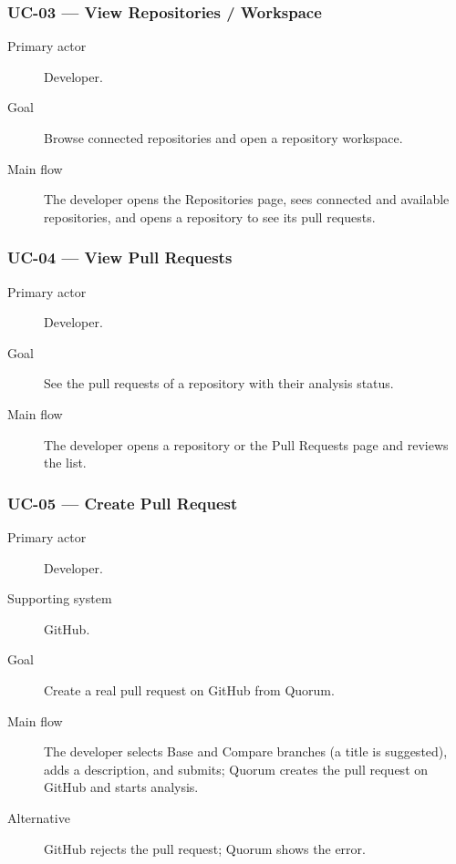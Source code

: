 \subsubsection{UC-03 --- View Repositories / Workspace}
\begin{description}
  \item[Primary actor] Developer.
  \item[Goal] Browse connected repositories and open a repository workspace.
  \item[Main flow] The developer opens the Repositories page, sees connected
        and available repositories, and opens a repository to see its pull
        requests.
\end{description}

\subsubsection{UC-04 --- View Pull Requests}
\begin{description}
  \item[Primary actor] Developer.
  \item[Goal] See the pull requests of a repository with their analysis
        status.
  \item[Main flow] The developer opens a repository or the Pull Requests page
        and reviews the list.
\end{description}

\subsubsection{UC-05 --- Create Pull Request}
\begin{description}
  \item[Primary actor] Developer.
  \item[Supporting system] GitHub.
  \item[Goal] Create a real pull request on GitHub from Quorum.
  \item[Main flow] The developer selects Base and Compare branches (a title is
        suggested), adds a description, and submits; Quorum creates the pull
        request on GitHub and starts analysis.
  \item[Alternative] GitHub rejects the pull request; Quorum shows the error.
\end{description}

